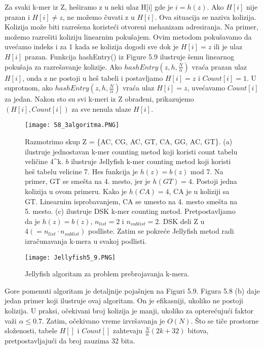 \documentclass{article}
\begin{document}
Za svaki k-mer iz Z, heširamo z u neki ulaz H[i] gde je $i = h(z)$. Ako $H[i]$ nije prazan i $H[i] \neq z$, ne možemo čuvati z u $H[i]$. Ova situacija se naziva kolizija. Kolizija može biti razrešena koristeći otvoreni mehanizam adresiranja. Na primer, možemo razrešiti koliziju linearnim pokušajem. Ovim metodom pokušavamo da uvećamo indeks i za 1 kada se kolizija dogodi sve dok je $H[i] = z$ ili je ulaz $H[i]$ prazan. Funkcija hashEntry() iz Figure 5.9 ilustruje šemu linearnog pokušaja za razrešavanje kolizije. Ako $hashEntry(z, h, \frac{N}{\alpha})$ vraća prazan ulaz $H[i]$, onda z ne postoji u heš tabeli i postavljamo $H[i] = z$ i $Count[i] = 1$. U suprotnom, ako $hashEntry(z, h, \frac{N}{\alpha})$ vraća ulaz $H[i] = z$, uvećavamo $Count[i]$ za jedan. Nakon sto su svi k-meri iz Z obrađeni, prikazujemo $(H[i], Count[i])$ za sve nenula ulaze $H[i]$.\\

\begin{figure}[h]
\texttt{[image: 58\_3algoritma.PNG]}
\caption{Razmotrimo skup Z = \{AC, CG, AC, GT, CA, GG, AC, GT\}. (a) ilustruje jednostavan k-mer counting metod koji koristi count tabelu veličine 4^k. \(b\) ilustruje Jellyfish k-mer counting metod koji koristi heš tabelu velicine 7. Hes funkcija je $h(z) = b(z)$ mod 7. Na primer, GT se smešta na 4. mesto, jer je $h(GT) = 4$. Postoji jedna kolizija u ovom primeru. Kako je $h(CA) = 4$, CA je u koliziji sa GT. Linearnim isprobavanjem, CA se umesto na 4. mesto smešta na 5. mesto. (c) ilustruje DSK k-mer counting metod. Pretpostavljamo da je $h(z) = b(z)$, $n_{list} = 2$ i $n_{sublist} = 2$. DSK deli Z u $4(= n_{list} \cdot n_{sublist})$ podliste. Zatim se pokreće Jellyfish metod radi izračunavanja k-mera u svakoj podlisti.}
\end{figure}

\begin{figure}[h]
\texttt{[image: Jellyfish5\_9.PNG]}
\caption{Jellyfish algoritam za problem prebrojavanja k-mera.}
\end{figure}


Gore pomenuti algoritam je detaljnije pojašnjen na Figuri 5.9. Figura 5.8 (b) daje jedan primer koji ilustruje ovaj algoritam. On je efikasniji, ukoliko ne postoji kolizija. U praksi, očekivani broj kolizija je manji, ukoliko za opterećujući faktor važi $\alpha \leq 0.7$. Zatim, očekivano vreme izvršavanja je $O(N)$. Što se tiče prostorne složenosti, tabele $H[]$ i $Count[]$ zahtevaju $\frac{N}{\alpha}(2k + 32)$ bitova, pretpostavljajući da broj zauzima 32 bita.\\
\end{document}
